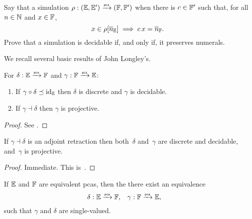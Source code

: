 \begin{exercise}
  \label{exc:simulation-numerals}%
  Say that a simulation $\rho: (\EE, \subEE) \pcato (\FF, \subFF)$ 
  when there is $c \in \subFF$ such that, for all $n \in \NN$ and $x \in \FF$,
  \begin{equation*}
    x \in \rho[\overline{n}_\EE] \implies c \, x = \overline{n}_\FF.
  \end{equation*}
  Prove that a simulation is decidable if, and only if, it preserves numerals.
\end{exercise}

We recall several basic results of John Longley's.

\begin{theorem}
  \label{th:simulation-properties2}%
  For $\delta: \EE \pcato \FF$ and $\gamma: \FF \pcato \EE$:
  \begin{enumerate}
  \item
    If $\gamma \circ \delta \preceq \id[\EE]$ then $\delta$ is discrete 
    and $\gamma$ is decidable.
  \item
    If $\gamma \dashv \delta$ then $\gamma$ is projective.
  \end{enumerate}
\end{theorem}

\begin{proof}
  See \cite[Theorem 2.5.3]{Longley:94}.
\end{proof}

\begin{corollary}
  \label{th:simulation-properties}%
  If $\gamma \dashv \delta$ is an adjoint retraction then both~$\delta$
  and~$\gamma$ are discrete and decidable, and~$\gamma$ is projective.
\end{corollary}

\begin{proof}
  Immediate. This is~\cite[Corollary 2.5.4]{Longley:94}.
\end{proof}

\begin{corollary}
  \label{th:simulation-properties-more}%
  If $\EE$ and $\FF$ are equivalent pcas, then the there exist an equivalence
  \begin{align*}
    \delta &: \EE \pcato \FF,
    &
    \gamma &: \FF \pcato \EE,
  \end{align*}
  such that $\gamma$ and $\delta$ are single-valued.
\end{corollary}

